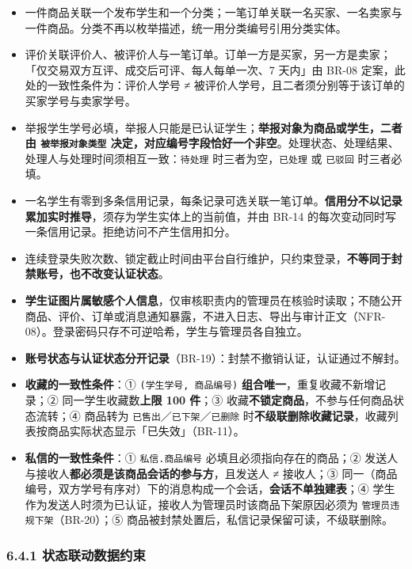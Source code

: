\documentclass[12pt,a4paper]{ctexart}
\begin{document}
\begin{itemize}[leftmargin=1.6em,itemsep=1pt,topsep=2pt]
\item 一件商品关联一个发布学生和一个分类；一笔订单关联一名买家、一名卖家与一件商品。分类不再以枚举描述，统一用分类编号引用分类实体。
\item 评价关联评价人、被评价人与一笔订单。订单一方是买家，另一方是卖家；「仅交易双方互评、成交后可评、每人每单一次、7 天内」由 BR-08 定案，此处的一致性条件为：评价人学号 ≠ 被评价人学号，且二者须分别等于该订单的买家学号与卖家学号。
\item 举报学生学号必填，举报人只能是已认证学生；\textbf{举报对象为商品或学生，二者由 \texttt{被举报对象类型} 决定，对应编号字段恰好一个非空}。处理状态、处理结果、处理人与处理时间须相互一致：\texttt{待处理} 时三者为空，\texttt{已处理} 或 \texttt{已驳回} 时三者必填。
\item 一名学生有零到多条信用记录，每条记录可选关联一笔订单。\textbf{信用分不以记录累加实时推导}，须存为学生实体上的当前值，并由 BR-14 的每次变动同时写一条信用记录。拒绝访问不产生信用扣分。
\item 连续登录失败次数、锁定截止时间由平台自行维护，只约束登录，\textbf{不等同于封禁账号，也不改变认证状态}。
\item \textbf{学生证图片属敏感个人信息}，仅审核职责内的管理员在核验时读取；不随公开商品、评价、订单或消息通知暴露，不进入日志、导出与审计正文（NFR-08）。登录密码只存不可逆哈希，学生与管理员各自独立。
\item \textbf{账号状态与认证状态分开记录}（BR-19）：封禁不撤销认证，认证通过不解封。
\item \textbf{收藏的一致性条件}：① \texttt{(学生学号, 商品编号)} \textbf{组合唯一}，重复收藏不新增记录；② 同一学生收藏数\textbf{上限 100 件}；③ 收藏\textbf{不锁定商品}，不参与任何商品状态流转；④ 商品转为 \texttt{已售出}／\texttt{已下架}／\texttt{已删除} 时\textbf{不级联删除收藏记录}，收藏列表按商品实际状态显示「已失效」（BR-11）。
\item \textbf{私信的一致性条件}：① \texttt{私信.商品编号} 必填且必须指向存在的商品；② 发送人与接收人\textbf{都必须是该商品会话的参与方}，且发送人 ≠ 接收人；③ 同一（商品编号，双方学号有序对）下的消息构成一个会话，\textbf{会话不单独建表}；④ 学生作为发送人时须为已认证，接收人为管理员时该商品下架原因必须为 \texttt{管理员违规下架}（BR-20）；⑤ 商品被封禁处置后，私信记录保留可读，不级联删除。
\end{itemize}

\subsubsection*{6.4.1 状态联动数据约束}
\end{document}
